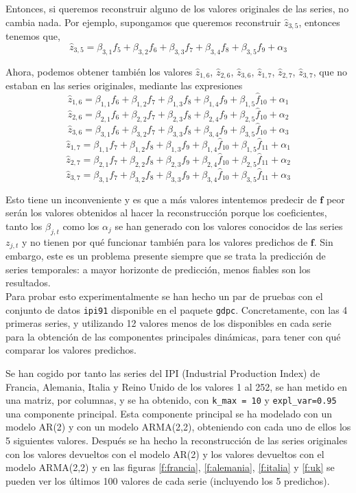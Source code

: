 Entonces, si queremos reconstruir alguno de los valores originales de las series, no cambia nada. Por ejemplo, supongamos que queremos reconstruir $\widehat{z}_{3,5}$, entonces tenemos que,
\[	\widehat{z}_{3,5} = \beta_{3,1}f_5 + \beta_{3,2}f_6 + \beta_{3,3}f_7 + \beta_{3,4}f_8 + \beta_{3,5}f_9 + \alpha_3	\]

Ahora, podemos obtener también los valores $\widehat{z}_{1,6}$, $\widehat{z}_{2,6}$, $\widehat{z}_{3,6}$, $\widehat{z}_{1,7}$, $\widehat{z}_{2,7}$, $\widehat{z}_{3,7}$, que no estaban en las series originales, mediante las expresiones
\[	\widehat{z}_{1,6} = \beta_{1,1}f_6 + \beta_{1,2}f_7 + \beta_{1,3}f_8 + \beta_{1,4}f_9 + \beta_{1,5}\widehat{f}_{10} + \alpha_1	\]
\[	\widehat{z}_{2,6} = \beta_{2,1}f_6 + \beta_{2,2}f_7 + \beta_{2,3}f_8 + \beta_{2,4}f_9 + \beta_{2,5}\widehat{f}_{10} + \alpha_2	\]
\[	\widehat{z}_{3,6} = \beta_{3,1}f_6 + \beta_{3,2}f_7 + \beta_{3,3}f_8 + \beta_{3,4}f_9 + \beta_{3,5}\widehat{f}_{10} + \alpha_3	\]
\[	\widehat{z}_{1,7} = \beta_{1,1}f_7 + \beta_{1,2}f_8 + \beta_{1,3}f_9 + \beta_{1,4}\widehat{f}_{10} + \beta_{1,5}\widehat{f}_{11} + \alpha_1	\]
\[	\widehat{z}_{2,7} = \beta_{2,1}f_7 + \beta_{2,2}f_8 + \beta_{2,3}f_9 + \beta_{2,4}\widehat{f}_{10} + \beta_{2,5}\widehat{f}_{11} + \alpha_2	\]
\[	\widehat{z}_{3,7} = \beta_{3,1}f_7 + \beta_{3,2}f_8 + \beta_{3,3}f_9 + \beta_{3,4}\widehat{f}_{10} + \beta_{3,5}\widehat{f}_{11} + \alpha_3	\]

Esto tiene un inconveniente y es que a más valores intentemos predecir de $\mathbf{f}$ peor serán los valores obtenidos al hacer la reconstrucción porque los coeficientes, tanto los $\beta_{j,t}$ como los $\alpha_j$ se han generado con los valores conocidos de las series $z_{j,t}$ y no tienen por qué funcionar también para los valores predichos de $\mathbf{f}$. Sin embargo, este es un problema presente siempre que se trata la predicción de series temporales: a mayor horizonte de predicción, menos fiables son los resultados.\\

Para probar esto experimentalmente se han hecho un par de pruebas con el conjunto de datos \texttt{ipi91} disponible en el paquete \texttt{gdpc}. Concretamente, con las 4 primeras series, y utilizando 12 valores menos de los disponibles en cada serie para la obtención de las componentes principales dinámicas, para tener con qué comparar los valores predichos.

Se han cogido por tanto las series del IPI (Industrial Production Index) de Francia, Alemania, Italia y Reino Unido de los valores 1 al 252, se han metido en una matriz, por columnas, y se ha obtenido, con \texttt{k\_max = 10} y \texttt{expl\_var=0.95} una componente principal. Esta componente principal se ha modelado con un modelo AR(2) y con un modelo ARMA(2,2), obteniendo con cada uno de ellos los 5 siguientes valores. Después se ha hecho la reconstrucción de las series originales con los valores devueltos con el modelo AR(2) y los valores devueltos con el modelo ARMA(2,2) y en las figuras \ref{f:francia}, \ref{f:alemania}, \ref{f:italia} y \ref{f:uk} se pueden ver los últimos 100 valores de cada serie (incluyendo los 5 predichos).

